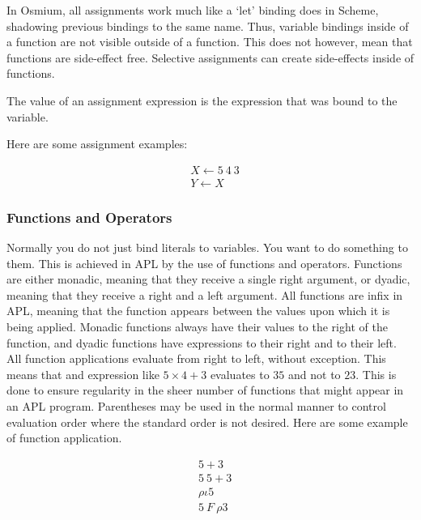 In Osmium, all assignments work much like a `let' binding does in Scheme, 
shadowing previous bindings to the same name. Thus, variable bindings inside 
of a function are not visible outside of a function. This does not however, 
mean that functions are side-effect free. Selective assignments can 
create side-effects inside of functions.

The value of an assignment expression is the expression that was bound to 
the variable.

Here are some assignment examples:

\begin{align}
&X\gets 5\ 4\ 3\\
&Y\gets X
\end{align}

\subsubsection{Functions and Operators}

Normally you do not just bind literals to variables. You want to do something 
to them. This is achieved in APL by the use of functions and operators.
Functions are either monadic, meaning that they receive a single right 
argument, or dyadic, meaning that they receive a right and a left argument. 
All functions are infix in APL, meaning that the function appears 
between the values upon which it is being applied. Monadic functions always 
have their values to the right of the function, and dyadic functions have 
expressions to their right and to their left. All function applications 
evaluate from right to left, without exception. This means that 
and expression like $5\times 4 + 3$ evaluates to $35$ and not to $23$.
This is done to ensure regularity in the sheer number of functions that 
might appear in an APL program. Parentheses may be used in the normal 
manner to control evaluation order where the standard order is not desired.
Here are some example of function application.

\begin{align}
&5 + 3\\
&5\ 5 + 3\\
&\rho\iota 5 \\
&5\ F\ \rho 3
\end{align}

